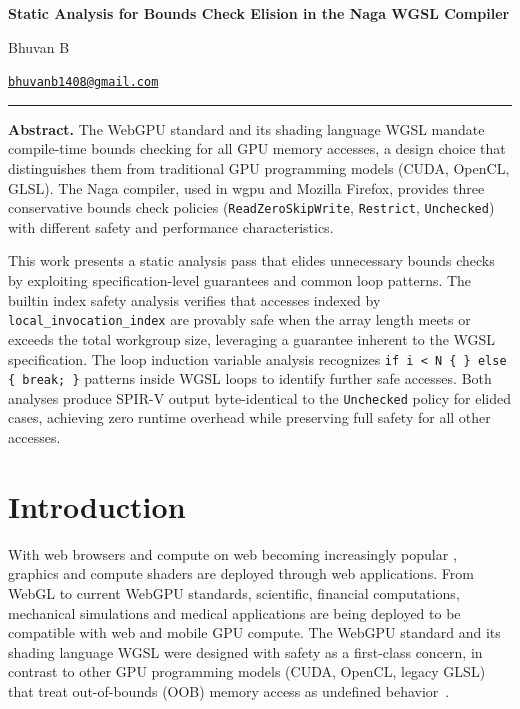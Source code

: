 \documentclass[11pt,a4paper]{article}
\begin{document}
\begin{center}
  {\LARGE\bfseries Static Analysis for Bounds Check Elision in the Naga WGSL Compiler\par}
\end{center}
\vspace{4pt}
{\large Bhuvan B\par}
{\normalsize\href{mailto:bhuvanb1408@gmail.com}{\texttt{bhuvanb1408@gmail.com}}\par}
\vspace{8pt}
\hrule
\vspace{8pt}
\noindent\textbf{Abstract.}
The WebGPU standard and its shading language WGSL mandate compile-time bounds
checking for all GPU memory accesses, a design choice that distinguishes them
from traditional GPU programming models (CUDA, OpenCL, GLSL). The Naga
compiler, used in wgpu and Mozilla Firefox, provides three conservative
bounds check policies (\texttt{ReadZeroSkipWrite}, \texttt{Restrict},
\texttt{Unchecked}) with different safety and performance characteristics.

This work presents a static analysis pass that elides unnecessary bounds
checks by exploiting specification-level guarantees and common loop patterns.
The builtin index safety analysis verifies that accesses indexed by
\texttt{local\_invocation\_index} are provably safe when the array length
meets or exceeds the total workgroup size, leveraging a guarantee inherent
to the WGSL specification. The loop induction variable analysis recognizes
\texttt{if i < N \{ \} else \{ break; \}} patterns inside WGSL loops to
identify further safe accesses. Both analyses produce SPIR-V output
byte-identical to the \texttt{Unchecked} policy for elided cases, achieving
zero runtime overhead while preserving full safety for all other accesses. 
  


\section{Introduction}
\label{sec:intro}

With web browsers and compute on web becoming  increasingly popular , graphics and compute shaders are deployed through web applications. From WebGL to current WebGPU standards, scientific, financial computations, mechanical simulations and medical applications are being deployed to be compatible with web and mobile GPU compute. 
The WebGPU standard and its shading
language WGSL were designed with safety as a first-class concern, in contrast
to other GPU programming models (CUDA, OpenCL, legacy GLSL) that treat
out-of-bounds (OOB) memory access as undefined behavior~\cite{webgpu_spec,wgsl_spec}.
\end{document}
